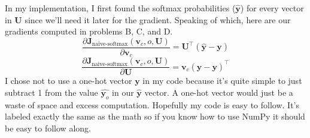 \documentclass[12pt]{article}
\begin{document}
In my implementation, I first found the softmax probabilities ($ \hat{ \bm y}$) 
for every vector in $\bm U$ since we'll need it later for the gradient. Speaking of which, 
here are our gradients computed in problems B, C, and D. 
\begin{equation*}
    \frac{\partial \bm J_{\text{naive-softmax}}(\bm v_c, o, \bm U)}{\partial \bm v_c} = 
    \bm U^\top (\bm {\hat y} - \bm y)
\end{equation*}
\begin{equation*}
    \frac{\partial \bm J_{\text{naive-softmax}}(\bm v_c, o, \bm U)}{\partial \bm U} = 
    \bm v_c ( \bm {\hat y} - \bm y )^\top
\end{equation*}
I chose not to use a one-hot vector $\bm y$ in my code because it's quite simple 
to just subtract 1 from the value $ \hat{ \bm y_o}$ in our $\hat {\bm y}$ vector. 
A one-hot vector would just be a waste of space and excess computation. Hopefully my code 
is easy to follow. It's labeled exactly the same as the math so if you know how to use 
NumPy it should be easy to follow along. 
\end{document}
